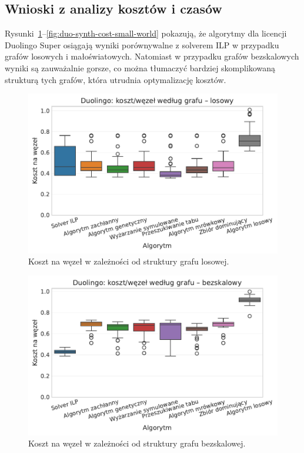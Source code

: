 \subsection{Wnioski z analizy kosztów i czasów}

Rysunki~\ref{fig:duo-synth-cost-random}--\ref{fig:duo-synth-cost-small-world} pokazują, że algorytmy dla licencji Duolingo Super osiągają wyniki porównywalne z solverem ILP w przypadku grafów losowych i małoświatowych. Natomiast w przypadku grafów bezskalowych wyniki są zauważalnie gorsze, co można tłumaczyć bardziej skomplikowaną strukturą tych grafów, która utrudnia optymalizację kosztów.



\begin{figure}[H]
  \centering
  \includegraphics[width=0.65\linewidth]{assets/figures/benchmark/synthetic/duolingo_cost_per_node_by_graph_random.pdf}
  \caption{Koszt na węzeł w zależności od struktury grafu losowej.}
  \label{fig:duo-synth-cost-random}
\end{figure}

\begin{figure}[H]
  \centering
  \includegraphics[width=0.65\linewidth]{assets/figures/benchmark/synthetic/duolingo_cost_per_node_by_graph_scale_free.pdf}
  \caption{Koszt na węzeł w zależności od struktury grafu bezskalowej.}
  \label{fig:duo-synth-cost-scale-free}
\end{figure}

